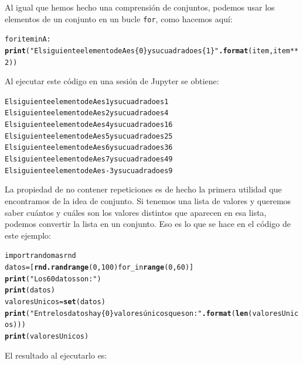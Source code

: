 \documentclass[10pt,a4paper]{article}\usepackage[]{graphicx}\usepackage[]{color}
\makeatletter
\newcommand{\hlstr}[1]{\textcolor[rgb]{0.192,0.494,0.8}{#1}}%
\newcommand{\hlkwd}[1]{\textcolor[rgb]{0.737,0.353,0.396}{\textbf{#1}}}%
\newenvironment{kframe}{%
 \def\at@end@of@kframe{}%
 \ifinner\ifhmode%
  \def\at@end@of@kframe{\end{minipage}}%
  \begin{minipage}{\columnwidth}%
 \fi\fi%
 \def\FrameCommand##1{\hskip\@totalleftmargin \hskip-\fboxsep
 \colorbox{shadecolor}{##1}\hskip-\fboxsep
     \hskip-\linewidth \hskip-\@totalleftmargin \hskip\columnwidth}%
 \MakeFramed {\advance\hsize-\width
   \@totalleftmargin\z@ \linewidth\hsize
   \@setminipage}}%
 {\par\unskip\endMakeFramed%
 \at@end@of@kframe}
\newenvironment{knitrout}{}{} %
\newcounter {cont01}
\makeatother
\begin{document}
Al igual que hemos hecho una {\sf comprensión de conjuntos}, podemos usar los elementos de un conjunto en un bucle {\tt for}, como hacemos aquí:
\begin{knitrout}
\color{fgcolor}\begin{kframe}
\begin{alltt}
for item in A:
  \hlkwd{print}(\hlstr{"El siguiente elemento de A es \{0\} y su cuadrado es \{1\}"}\hlkwd{.format}(item, item**2))
\end{alltt}
\end{kframe}
\end{knitrout}
Al ejecutar este código en una sesión de Jupyter se obtiene:
\begin{knitrout}
\color{fgcolor}\begin{kframe}
\begin{alltt}
El siguiente elemento de A es 1 y su cuadrado es 1
El siguiente elemento de A es 2 y su cuadrado es 4
El siguiente elemento de A es 4 y su cuadrado es 16
El siguiente elemento de A es 5 y su cuadrado es 25
El siguiente elemento de A es 6 y su cuadrado es 36
El siguiente elemento de A es 7 y su cuadrado es 49
El siguiente elemento de A es -3 y su cuadrado es 9
\end{alltt}
\end{kframe}
\end{knitrout}
La propiedad de no contener repeticiones es de hecho la primera utilidad que encontramos de la idea de conjunto. Si tenemos una lista de valores y queremos saber cuántos y cuáles son los valores distintos que aparecen en esa lista, podemos convertir la lista en un conjunto. Eso es lo que se hace en el código de este ejemplo:
\begin{knitrout}
\color{fgcolor}\begin{kframe}
\begin{alltt}
import random as rnd
datos = [\hlkwd{rnd.randrange}(0, 100) for _ in \hlkwd{range}(0, 60)]
\hlkwd{print}(\hlstr{"Los 60 datos son:"} )
\hlkwd{print}(datos)
valoresUnicos = \hlkwd{set}(datos)
\hlkwd{print}(\hlstr{"Entre los datos hay \{0\} valores únicos que son:"}\hlkwd{.format}(\hlkwd{len}(valoresUnicos)))
\hlkwd{print}(valoresUnicos)
\end{alltt}
\end{kframe}
\end{knitrout}
El resultado al ejecutarlo es:
\end{document}
